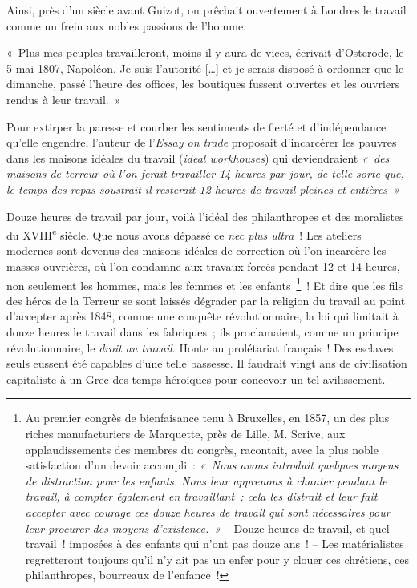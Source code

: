 \documentclass[french,twoside]{book} %
\newenvironment{quoteblock}%
  {\begin{quoting}}
  {\end{quoting}}
\newenvironment{quotebar}{%
    \def\FrameCommand{{\color{rubric!10!}\vrule width 0.5em} \hspace{0.9em}}%
    \def\OuterFrameSep{\itemsep} %
    \MakeFramed {\advance\hsize-\width \FrameRestore}
  }%
  {%
    \endMakeFramed
  }
\renewenvironment{quoteblock}%
  {%
    \savenotes
    \setstretch{0.9}
    \normalfont
    \begin{quotebar}
  }
  {%
    \end{quotebar}
    \spewnotes
  }
\begin{document}
\noindent Ainsi, près d’un siècle avant Guizot, on prêchait ouvertement à Londres le travail comme un frein aux nobles passions de l’homme.\par

\begin{quoteblock}
 \noindent « Plus mes peuples travailleront, moins il y aura de vices, écrivait d’Osterode, le 5 mai 1807, Napoléon. Je suis l’autorité […] et je serais disposé à ordonner que le dimanche, passé l’heure des offices, les boutiques fussent ouvertes et les ouvriers rendus à leur travail. »
\end{quoteblock}

\noindent Pour extirper la paresse et courber les sentiments de fierté et d’indépendance qu’elle engendre, l’auteur de l’\emph{Essay on trade} proposait d’incarcérer les pauvres dans les maisons idéales du travail (\emph{ideal workhouses}) qui deviendraient \emph{« des maisons de terreur où l’on ferait travailler 14 heures par jour, de telle sorte que, le temps des repas soustrait il resterait 12 heures de travail pleines et entières »}\par
Douze heures de travail par jour, voilà l’idéal des philanthropes et des moralistes du XVIII\textsuperscript{e} siècle. Que nous avons dépassé ce\emph{ nec plus ultra} ! Les ateliers modernes sont devenus des maisons idéales de correction où l’on incarcère les masses ouvrières, où l’on condamne aux travaux forcés pendant 12 et 14 heures, non seulement les hommes, mais les femmes et les enfants \footnote{Au premier congrès de bienfaisance tenu à Bruxelles, en 1857, un des plus riches manufacturiers de Marquette, près de Lille, M. Scrive, aux applaudissements des membres du congrès, racontait, avec la plus noble satisfaction d’un devoir accompli : \emph{« Nous avons introduit quelques moyens de distraction pour les enfants. Nous leur apprenons à chanter pendant le travail, à compter également en travaillant : cela les distrait et leur fait accepter avec courage \emph{ces douze heures de travail qui sont nécessaires pour leur procurer des moyens d’existence}. »} – Douze heures de travail, et quel travail ! imposées à des enfants qui n’ont pas douze ans ! – Les matérialistes regretteront toujours qu’il n’y ait pas un enfer pour y clouer ces chrétiens, ces philanthropes, bourreaux de l’enfance !} ! Et dire que les fils des héros de la Terreur se sont laissés dégrader par la religion du travail au point d’accepter après 1848, comme une conquête révolutionnaire, la loi qui limitait à douze heures le travail dans les fabriques ; ils proclamaient, comme un principe révolutionnaire, le \emph{droit au travail}. Honte au prolétariat français ! Des esclaves seuls eussent été capables d’une telle bassesse. Il faudrait vingt ans de civilisation capitaliste à un Grec des temps héroïques pour concevoir un tel avilissement.\par
\end{document}
